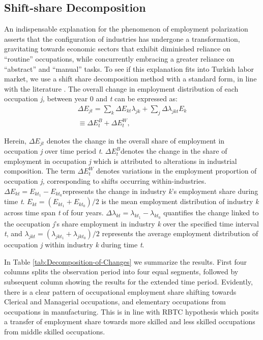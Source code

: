 \subsection{Shift-share Decomposition}

\begin{onehalfspace}
An indispensable explanation for the phenomenon of employment polarization
asserts that the configuration of industries has undergone a transformation,
gravitating towards economic sectors that exhibit diminished reliance
on ``routine'' occupations, while concurrently
embracing a greater reliance on ``abstract''
and ``manual'' tasks. To see if this explanation
fits into Turkish labor market, we use a shift share decomposition
method with a standard form, in line with the literature \citep{Acemoglu2011,2018Barany,2014Goos}.
The overall change in employment distribution of each occupation \textit{j,}
between year 0 and \textit{t} can be expressed as:
\begin{gather}
\varDelta E_{jt}=\sum_{k}\varDelta E_{kt}\lambda_{jk}+\sum_{j}\varDelta\lambda_{jkt}E_{k}\nonumber \\
\equiv\varDelta E_{t}^{B}+\varDelta E_{t}^{W},\label{eq:}
\end{gather}

Herein, $\varDelta E_{jt}$ denotes the change in the overall share
of employment in occupation \textit{j }over time period \textit{t}.
$\varDelta E_{t}^{B}$denotes the change in the share of employment
in occupation \textit{j }which is attributed to alterations in industrial
composition. The term $\varDelta E_{t}^{W}$ denotes variations in
the employment proportion of occupation \textit{j,} corresponding
to shifts occurring within-industries. $\varDelta E_{kt}=E_{kt_{1}}-E_{kt_{0}}$represents
the change in industry \emph{k}'s employment share during time \emph{t}.
$E_{kt}=(E_{kt_{1}}+E_{kt_{0}})/2$ is the mean employment distribution
of industry\emph{ k} across time span \emph{t} of four years. $\varDelta\lambda_{kt}=\lambda_{kt_{1}}-\lambda_{kt_{0}}$
quantifies the change linked to the occupation \emph{j}'s share employment
in industry \emph{k} over the specified time interval \emph{t}, and
$\lambda_{jkt}=(\lambda_{jkt_{1}}+\lambda_{jkt_{0}})/2$ represents
the average employment distribution of occupation \emph{j} within
industry \emph{k} during time \emph{t}.

In Table \ref{tab:Decomposition-of-Changes} we summarize the results.
First four columns splits the observation period into four equal segments,
followed by subsequent column showing the results for the extended
time period. Evidently, there is a clear pattern of occupational employment
share shifting towards Clerical and Managerial occupations, and elementary
occupations from occupations in manufacturing. This is in line with
RBTC hypothesis which posits a transfer of employment share towards
more skilled and less skilled occupations from middle skilled occupations.


\end{onehalfspace}

